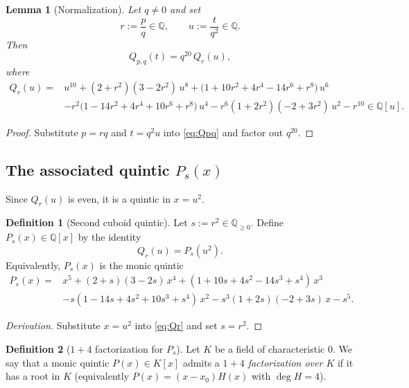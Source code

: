\documentclass[12pt]{article}
\newtheorem{lemma}{Lemma}
\theoremstyle{remark}
\theoremstyle{definition}
\newtheorem{definition}{Definition}
\begin{document}
\begin{lemma}[Normalization]\label{lem:normalize}
Let $q\neq 0$ and set
\[
r:=\frac{p}{q}\in\mathbb{Q},\qquad u:=\frac{t}{q^{2}}\in\mathbb{Q}.
\]
Then
\begin{equation}\label{eq:normalize}
Q_{p,q}(t)=q^{20}\,Q_r(u),
\end{equation}
where
\begin{equation}\label{eq:Qr}
\begin{aligned}
Q_r(u)
={}& u^{10} + (2+r^2)(3-2r^2)\,u^{8} + \bigl(1+10r^2+4r^4-14r^6+r^8\bigr)\,u^{6}\\
& - r^2\bigl(1-14r^2+4r^4+10r^6+r^8\bigr)\,u^{4}
 - r^6(1+2r^2)(-2+3r^2)\,u^{2}
 - r^{10}\in\mathbb{Q}[u].
\end{aligned}
\end{equation}
\end{lemma}

\begin{proof}
Substitute $p=rq$ and $t=q^2u$ into \eqref{eq:Qpq} and factor out $q^{20}$.
\end{proof}

\subsection{The associated quintic \texorpdfstring{$P_s(x)$}{Ps(x)}}
Since $Q_r(u)$ is even, it is a quintic in $x=u^2$.

\begin{definition}[Second cuboid quintic]\label{def:Ps}
Let $s:=r^2\in\mathbb{Q}_{\ge 0}$.
Define $P_s(x)\in\mathbb{Q}[x]$ by the identity
\begin{equation}\label{eq:QrPs}
Q_r(u)=P_s(u^2).
\end{equation}
Equivalently, $P_s(x)$ is the monic quintic
\begin{equation}\label{eq:Ps}
\begin{aligned}
P_s(x)
={}&x^{5} + (2+s)(3-2s)\,x^{4} + (1+10s+4s^{2}-14s^{3}+s^{4})\,x^{3}\\
& - s(1-14s+4s^{2}+10s^{3}+s^{4})\,x^{2}
 - s^{3}(1+2s)(-2+3s)\,x
 - s^{5}.
\end{aligned}
\end{equation}
\end{definition}

\begin{proof}[Derivation]
Substitute $x=u^2$ into \eqref{eq:Qr} and set $s=r^2$.
\end{proof}

\begin{definition}[$1+4$ factorization for $P_s$]\label{def:14}
Let $K$ be a field of characteristic $0$.
We say that a monic quintic $P(x)\in K[x]$ admits a \emph{$1+4$ factorization over $K$} if it has a root in $K$ (equivalently $P(x)=(x-x_0)H(x)$ with $\deg H=4$).
\end{definition}
\end{document}
